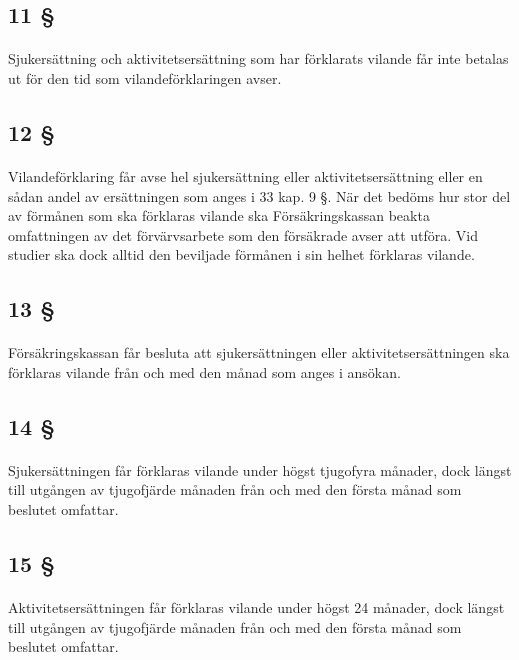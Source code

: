 \documentclass[a4paper,notitlepage,openany,10pt]{book}
\begin{document}
\subsection*{11 §}
\paragraph*{}
Sjukersättning och aktivitetsersättning som har förklarats vilande får inte betalas ut för den tid som vilandeförklaringen avser.
\subsection*{12 §}
\paragraph*{}
Vilandeförklaring får avse hel sjukersättning eller aktivitetsersättning eller en sådan andel av ersättningen som anges i 33 kap. 9 §. När det bedöms hur stor del av förmånen som ska förklaras vilande ska Försäkringskassan beakta omfattningen av det förvärvsarbete som den försäkrade avser att utföra. Vid studier ska dock alltid den beviljade förmånen i sin helhet förklaras vilande.
\subsection*{13 §}
\paragraph*{}
Försäkringskassan får besluta att sjukersättningen eller aktivitetsersättningen ska förklaras vilande från och med den månad som anges i ansökan.
\subsection*{14 §}
\paragraph*{}
Sjukersättningen får förklaras vilande under högst tjugofyra månader, dock längst till utgången av tjugofjärde månaden från och med den första månad som beslutet omfattar.
\subsection*{15 §}
\paragraph*{}
Aktivitetsersättningen får förklaras vilande under högst 24 månader, dock längst till utgången av tjugofjärde månaden från och med den första månad som beslutet omfattar.
\end{document}

